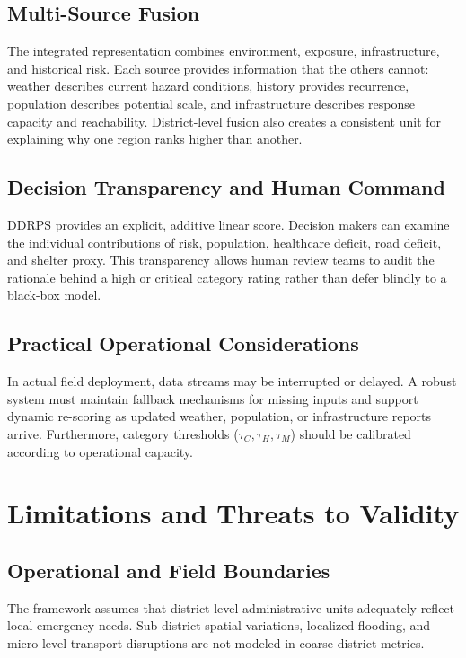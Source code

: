 \documentclass[conference]{IEEEtran}
\begin{document}
\subsection{Multi-Source Fusion}
The integrated representation combines environment, exposure, infrastructure,
and historical risk. Each source provides information that the others cannot:
weather describes current hazard conditions, history provides recurrence,
population describes potential scale, and infrastructure describes response
capacity and reachability. District-level fusion also creates a consistent unit
for explaining why one region ranks higher than another.

\subsection{Decision Transparency and Human Command}
DDRPS provides an explicit, additive linear score. Decision makers can examine
the individual contributions of risk, population, healthcare deficit, road
deficit, and shelter proxy. This transparency allows human review teams to
audit the rationale behind a high or critical category rating rather than defer
blindly to a black-box model.

\subsection{Practical Operational Considerations}
In actual field deployment, data streams may be interrupted or delayed. A robust
system must maintain fallback mechanisms for missing inputs and support
dynamic re-scoring as updated weather, population, or infrastructure reports
arrive. Furthermore, category thresholds ($\tau_C, \tau_H, \tau_M$) should be
calibrated according to operational capacity.

\section{Limitations and Threats to Validity}

\subsection{Operational and Field Boundaries}
The framework assumes that district-level administrative units adequately reflect
local emergency needs. Sub-district spatial variations, localized flooding, and
micro-level transport disruptions are not modeled in coarse district metrics.
\end{document}
